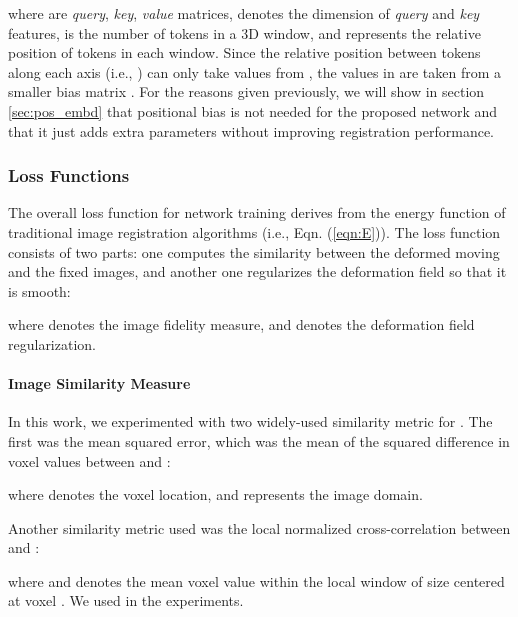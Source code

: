 \documentclass[times,twocolumn,final]{elsarticle}
\begin{document}
\begin{linenomath}

\end{linenomath}
where  are \textit{query}, \textit{key}, \textit{value} matrices,  denotes the dimension of \textit{query} and \textit{key} features,  is the number of tokens in a 3D window, and  represents the relative position of tokens in each window. Since the relative position between tokens along each axis (i.e., ) can only take values from , the values in  are taken from a smaller bias matrix . For the reasons given previously, we will show in section \ref{sec:pos_embd} that positional bias  is not needed for the proposed network and that it just adds extra parameters without improving registration performance.

\subsubsection{Loss Functions}
The overall loss function for network training derives from the energy function of traditional image registration algorithms (i.e., Eqn. (\ref{eqn:E})). The loss function consists of two parts: one computes the similarity between the deformed moving and the fixed images, and another one regularizes the deformation field so that it is smooth:
\begin{linenomath}

\end{linenomath}
where  denotes the image fidelity measure, and  denotes the deformation field regularization.
\paragraph{Image Similarity Measure}
In this work, we experimented with two widely-used similarity metric for . The first was the mean squared error, which was the mean of the squared difference in voxel values between  and :
\begin{linenomath}

\end{linenomath}
where  denotes the voxel location, and  represents the image domain.

Another similarity metric used was the local normalized cross-correlation between  and :
\begin{linenomath}

\end{linenomath}
where  and  denotes the mean voxel value within the local window of size  centered at voxel . We used  in the experiments.  
\end{document}
